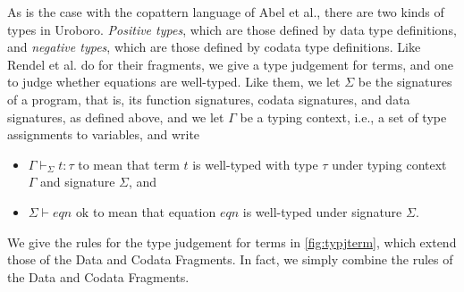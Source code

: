 %


As is the case with the copattern language of Abel et al.\cite{abel13copatterns}, there are two kinds of types in Uroboro. \textit{Positive types}, which are those defined by data type definitions, and \textit{negative types}, which are those defined by codata type definitions. Like Rendel et al. do for their fragments, we give a type judgement for terms, and one to judge whether equations are well-typed.  Like them, we let $\Sigma$ be the signatures of a program, that is, its function signatures, codata signatures, and data signatures, as defined above, and we let $\Gamma$ be a typing context, i.e., a set of type assignments to variables, and write
\begin{itemize}
\item $\Gamma \vdash_{\Sigma} t : \tau$ to mean that term $t$ is well-typed with type $\tau$ under typing context $\Gamma$ and signature $\Sigma$, and

\item $\Sigma \vdash eqn \textrm{ ok}$ to mean that equation $eqn$ is well-typed under signature $\Sigma$.
\end{itemize}
We give the rules for the type judgement for terms in \autoref{fig:typjterm}, which extend those of the Data and Codata Fragments. In fact, we simply combine the rules of the Data and Codata Fragments.

